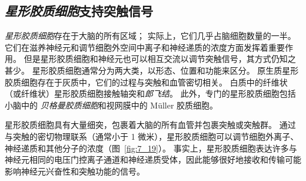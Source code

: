 \subsection{\textit{星形胶质细胞}支持突触信号}

\textit{星形胶质细胞}存在于大脑的所有区域；
实际上，它们几乎占脑细胞数量的一半。
它们在滋养神经元和调节细胞外空间中离子和神经递质的浓度方面发挥着重要作用。
但是星形胶质细胞和神经元也可以相互交流以调节突触信号，其方式仍知之甚少。
星形胶质细胞通常分为两大类，以形态、位置和功能来区分。
原生质星形胶质细胞存在于灰质中，它们的过程与突触和血管密切相关。
白质中的纤维状（或纤维状）星形胶质细胞接触轴突和\textit{郎飞结}。
此外，专门的星形胶质细胞包括小脑中的 \textit{贝格曼胶质细胞}和视网膜中的 Müller 胶质细胞。


星形胶质细胞具有大量细突，包裹着大脑的所有血管并包裹突触或突触群。
通过与突触的密切物理联系（通常小于 1 微米），星形胶质细胞可以调节细胞外离子、神经递质和其他分子的浓度（图~\ref{fig:7_19}）。
事实上，星形胶质细胞表达许多与神经元相同的电压门控离子通道和神经递质受体，因此能够很好地接收和传输可能影响神经元兴奋性和突触功能的信号。


